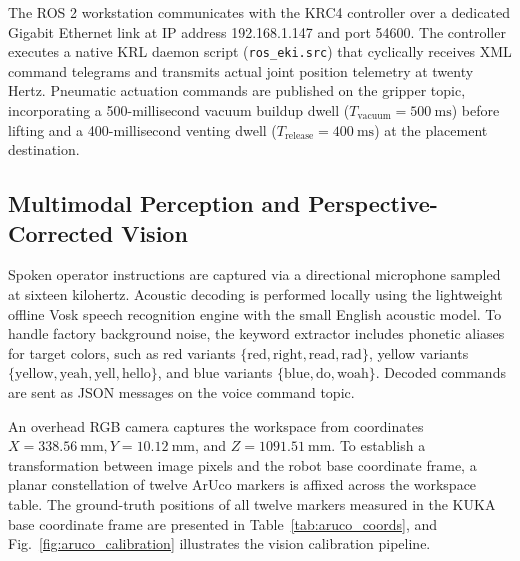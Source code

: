\documentclass{svproc}
\begin{document}
The ROS 2 workstation communicates with the KRC4 controller over a dedicated Gigabit Ethernet link at IP address 192.168.1.147 and port 54600. The controller executes a native KRL daemon script (\texttt{ros\_eki.src}) \cite{kuka_eki2019} that cyclically receives XML command telegrams and transmits actual joint position telemetry at twenty Hertz. Pneumatic actuation commands are published on the gripper topic, incorporating a 500-millisecond vacuum buildup dwell ($T_{\text{vacuum}} = \SI{500}{\milli\second}$) before lifting and a 400-millisecond venting dwell ($T_{\text{release}} = \SI{400}{\milli\second}$) at the placement destination.

\subsection{Multimodal Perception and Perspective-Corrected Vision}
Spoken operator instructions are captured via a directional microphone sampled at sixteen kilohertz. Acoustic decoding is performed locally using the lightweight offline Vosk speech recognition engine \cite{vosk2020} with the small English acoustic model. To handle factory background noise, the keyword extractor includes phonetic aliases for target colors, such as red variants $\{\text{red}, \text{right}, \text{read}, \text{rad}\}$, yellow variants $\{\text{yellow}, \text{yeah}, \text{yell}, \text{hello}\}$, and blue variants $\{\text{blue}, \text{do}, \text{woah}\}$. Decoded commands are sent as JSON messages on the voice command topic.

An overhead RGB camera captures the workspace from coordinates $X = \SI{338.56}{\milli\meter}, Y = \SI{10.12}{\milli\meter}$, and $Z = \SI{1091.51}{\milli\meter}$. To establish a transformation between image pixels and the robot base coordinate frame, a planar constellation of twelve ArUco markers \cite{aruco2014} is affixed across the workspace table. The ground-truth positions of all twelve markers measured in the KUKA base coordinate frame are presented in Table~\ref{tab:aruco_coords}, and Fig.~\ref{fig:aruco_calibration} illustrates the vision calibration pipeline.
\end{document}
